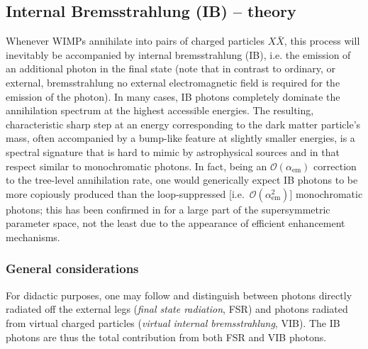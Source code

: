 \subsection{Internal Bremsstrahlung (IB) -- theory}

Whenever WIMPs annihilate into pairs of charged particles $X\bar X$, this process 
will inevitably be accompanied by internal 
bremsstrahlung (IB), i.e. the emission of an additional photon in the final state 
(note that in contrast to ordinary, or external, bremsstrahlung no external 
electromagnetic field is required for the emission of the photon). In many cases, 
IB photons completely dominate the annihilation spectrum at the highest accessible 
energies. The resulting, characteristic sharp step at an energy corresponding to 
the dark matter particle's mass, often accompanied by a bump-like feature at slightly smaller energies, is a spectral signature that is hard to mimic by 
astrophysical sources and in that respect similar to monochromatic photons. 
In fact, being an $\mathcal{O}(\alpha_\mathrm{em})$ correction to the tree-level 
annihilation rate, one would generically expect IB photons to be more copiously 
produced than the loop-suppressed [i.e.~$\mathcal{O}(\alpha_\mathrm{em}^2)$] 
monochromatic photons; this has been confirmed in \cite{Bringmann:2007nk} for a large part 
of the supersymmetric parameter space, not the least due to the appearance of 
efficient enhancement mechanisms. 



\subsubsection{General considerations}


For didactic purposes, one may follow \cite{Bringmann:2007nk} and distinguish between 
photons directly radiated off the external legs (\emph{final state radiation}, FSR) 
and photons radiated from virtual charged particles (\emph{virtual internal 
bremsstrahlung}, VIB). The IB photons are thus  the total contribution from both 
FSR and VIB photons.

